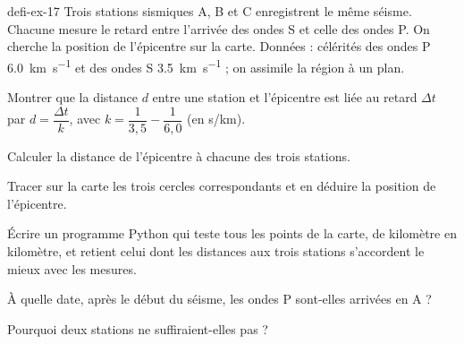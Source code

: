 \begin{blocEdition}{defi-ex-17}
Trois stations sismiques A, B et C enregistrent le même séisme. Chacune mesure le retard entre l'arrivée des ondes S et celle
des ondes P. On cherche la position de l'épicentre sur la carte.
Données : célérités des ondes P \qty{6,0}{km.s^{-1}} et des ondes S \qty{3,5}{km.s^{-1}} ; on assimile la région à un plan.
\begin{questions}
\item Montrer que la distance $d$ entre une station et l'épicentre est liée au retard $\Delta t$ par $d=\dfrac{\Delta t}{k}$, avec $k=\dfrac{1}{3{,}5}-\dfrac{1}{6{,}0}$ (en s/km).
\item Calculer la distance de l'épicentre à chacune des trois stations.
\item Tracer sur la carte les trois cercles correspondants et en déduire la position de l'épicentre.
\item Écrire un programme Python qui teste tous les points de la carte, de kilomètre en kilomètre, et retient celui dont les distances aux
trois stations s'accordent le mieux avec les mesures.
\item À quelle date, après le début du séisme, les ondes P sont-elles arrivées en A ?
\item Pourquoi deux stations ne suffiraient-elles pas ?
\end{questions}
\end{blocEdition}

